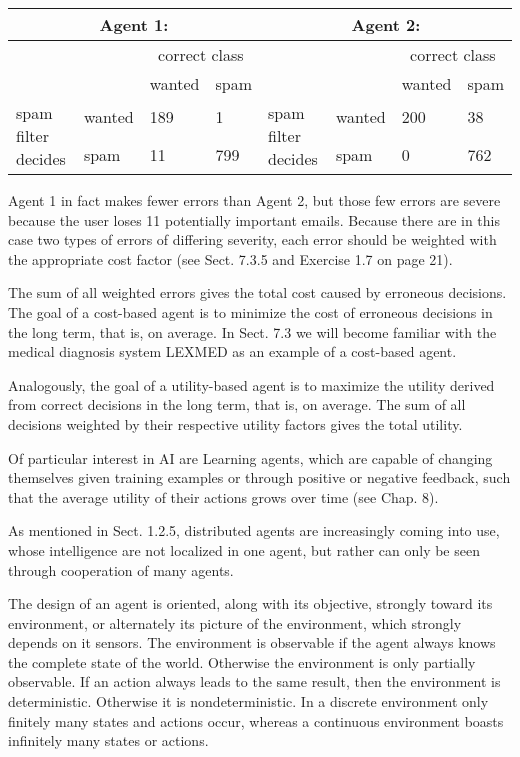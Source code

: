 \documentclass[10pt]{article}
\begin{document}
\begin{center}
\begin{tabular}{|l|l|l|l|l|l|l|l|}
\hline
\multicolumn{4}{|c|}{Agent 1:} & \multicolumn{4}{|c|}{Agent 2:} \\
\hline
\multicolumn{2}{|c|}{\multirow{2}{*}{}} & \multicolumn{2}{|c|}{correct class} & \multicolumn{2}{|c|}{\multirow{2}{*}{}} & \multicolumn{2}{|c|}{correct class} \\
\hline
 &  & wanted & spam &  &  & wanted & spam \\
\hline
\multirow{2}{*}{spam filter decides} & wanted & 189 & 1 & \multirow{2}{*}{spam filter decides} & wanted & 200 & 38 \\
\hline
 & spam & 11 & 799 &  & spam & 0 & 762 \\
\hline
\end{tabular}
\end{center}

Agent 1 in fact makes fewer errors than Agent 2, but those few errors are severe because the user loses 11 potentially important emails. Because there are in this case two types of errors of differing severity, each error should be weighted with the appropriate cost factor (see Sect. 7.3.5 and Exercise 1.7 on page 21).

The sum of all weighted errors gives the total cost caused by erroneous decisions. The goal of a cost-based agent is to minimize the cost of erroneous decisions in the long term, that is, on average. In Sect. 7.3 we will become familiar with the medical diagnosis system LEXMED as an example of a cost-based agent.

Analogously, the goal of a utility-based agent is to maximize the utility derived from correct decisions in the long term, that is, on average. The sum of all decisions weighted by their respective utility factors gives the total utility.

Of particular interest in AI are Learning agents, which are capable of changing themselves given training examples or through positive or negative feedback, such that the average utility of their actions grows over time (see Chap. 8).

As mentioned in Sect. 1.2.5, distributed agents are increasingly coming into use, whose intelligence are not localized in one agent, but rather can only be seen through cooperation of many agents.

The design of an agent is oriented, along with its objective, strongly toward its environment, or alternately its picture of the environment, which strongly depends on it sensors. The environment is observable if the agent always knows the complete state of the world. Otherwise the environment is only partially observable. If an action always leads to the same result, then the environment is deterministic. Otherwise it is nondeterministic. In a discrete environment only finitely many states and actions occur, whereas a continuous environment boasts infinitely many states or actions.
\end{document}
